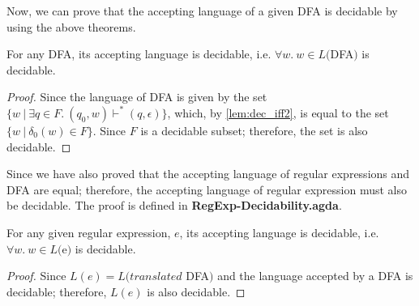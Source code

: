 \par Now, we can prove that the accepting language of a given DFA is
decidable by using the above theorems. 

\begin{thm}
\noindent For any DFA, its accepting language is decidable,
i.e. \(\forall w.\ w \in L(\)DFA\()\) is decidable. 
\end{thm}

\begin{proof}
\noindent Since the language of DFA is given by the set \(\{w\ |\
\exists q\in F.\ (q_0,w) \vdash^* (q,\epsilon)\}\), which, by
\autoref{lem:dec_iff2}, is equal to the set \(\{w\ |\ \delta_0(w) \in
F\}\). Since \(F\) is a decidable subset; therefore, the set is also
decidable. 
\end{proof}

\par Since we have also proved that the accepting language of regular
expressions and DFA are equal; therefore, the accepting language of
regular expression must also be decidable. The proof is defined in
\textbf{RegExp-Decidability.agda}. 

\begin{thm}
\noindent For any given regular expression, \(e\), its accepting language is
decidable, i.e. \(\forall w.\ w \in L(\)e\()\) is decidable. 
\end{thm}

\begin{proof}
\noindent Since \(L(e) = L(translated\) DFA\()\) and the language
accepted by a DFA is decidable; therefore, \(L(e)\) is also decidable. 
\end{proof}